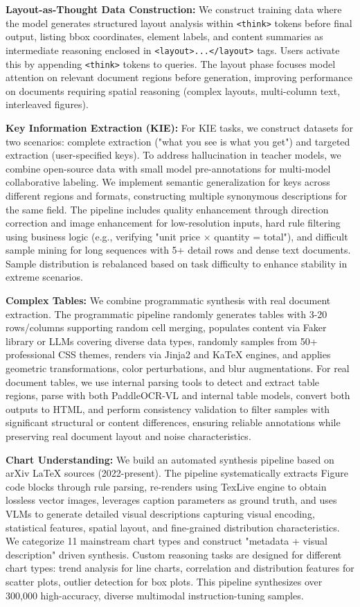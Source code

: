 \documentclass[dvipsnames]{article}
\begin{document}
\textbf{Layout-as-Thought Data Construction:}
We construct training data where the model generates structured layout analysis within \texttt{<think>} tokens before final output, listing bbox coordinates, element labels, and content summaries as intermediate reasoning enclosed in \texttt{<layout>...</layout>} tags. Users activate this by appending \texttt{<think>} tokens to queries. The layout phase focuses model attention on relevant document regions before generation, improving performance on documents requiring spatial reasoning (complex layouts, multi-column text, interleaved figures).

\textbf{Key Information Extraction (KIE):}
For KIE tasks, we construct datasets for two scenarios: complete extraction ("what you see is what you get") and targeted extraction (user-specified keys). To address hallucination in teacher models, we combine open-source data with small model pre-annotations for multi-model collaborative labeling. We implement semantic generalization for keys across different regions and formats, constructing multiple synonymous descriptions for the same field. The pipeline includes quality enhancement through direction correction and image enhancement for low-resolution inputs, hard rule filtering using business logic (e.g., verifying "unit price × quantity = total"), and difficult sample mining for long sequences with 5+ detail rows and dense text documents. Sample distribution is rebalanced based on task difficulty to enhance stability in extreme scenarios.

\textbf{Complex Tables:}
We combine programmatic synthesis with real document extraction. The programmatic pipeline randomly generates tables with 3-20 rows/columns supporting random cell merging, populates content via Faker library or LLMs covering diverse data types, randomly samples from 50+ professional CSS themes, renders via Jinja2 and KaTeX engines, and applies geometric transformations, color perturbations, and blur augmentations. For real document tables, we use internal parsing tools to detect and extract table regions, parse with both PaddleOCR-VL and internal table models, convert both outputs to HTML, and perform consistency validation to filter samples with significant structural or content differences, ensuring reliable annotations while preserving real document layout and noise characteristics.

\textbf{Chart Understanding:}
We build an automated synthesis pipeline based on arXiv LaTeX sources (2022-present). The pipeline systematically extracts Figure code blocks through rule parsing, re-renders using TexLive engine to obtain lossless vector images, leverages caption parameters as ground truth, and uses VLMs to generate detailed visual descriptions capturing visual encoding, statistical features, spatial layout, and fine-grained distribution characteristics. We categorize 11 mainstream chart types and construct "metadata + visual description" driven synthesis. Custom reasoning tasks are designed for different chart types: trend analysis for line charts, correlation and distribution features for scatter plots, outlier detection for box plots. This pipeline synthesizes over 300,000 high-accuracy, diverse multimodal instruction-tuning samples.
\end{document}
